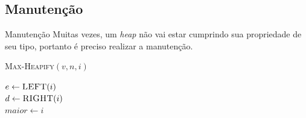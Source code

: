 \documentclass[t, 10pt]{beamer}
\begin{document}
  \subsection{Manutenção}
  
  \begin{frame}{Manutenção}
    Muitas vezes, um \emph{heap} não vai estar cumprindo sua propriedade de seu tipo, portanto é preciso
    realizar a manutenção.
    
    \begin{center}
    \begin{minipage}{0.75\textwidth}
    \begin{algorithm}[H]
      \caption{\textsc{Max-Heapify}$(v, n, i)$}
      $e \leftarrow \textsc{LEFT}(i)$  \\
      $d \leftarrow \textsc{RIGHT}(i)$ \\
      $maior \leftarrow i$ \\
    \end{algorithm}
    \end{minipage}
    \end{center}
  \end{frame}
  
\end{document}
